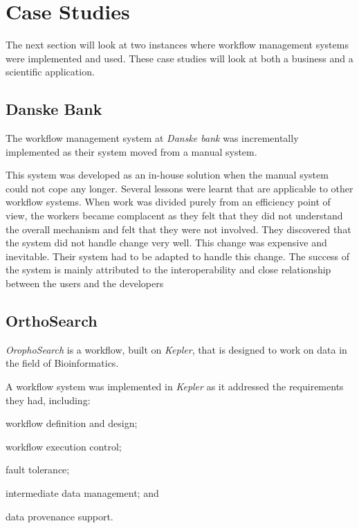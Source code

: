 \section{Case Studies}
The next section will look at two instances where workflow management systems
were implemented and used.  These case studies will look at both a business and
a scientific application.
    \subsection*{Danske Bank}
      The workflow management system at \emph{Danske bank} was incrementally
      implemented as their system moved from a manual
      system\cite{Brahe:2007:SWW:1316624.1316661}.

      This system was developed as an in-house solution when the manual system
      could not cope any longer.  Several lessons were learnt that are applicable
      to other workflow systems. When work was divided purely from an
      efficiency point of view, the workers became complacent as they felt that
      they did not understand the overall mechanism and felt that they were not
      involved. They discovered that the system did not handle change very
      well. This change was expensive and inevitable. Their system had to be
      adapted to handle this change. The success of the system is mainly
      attributed to the interoperability and close relationship between the
      users and the developers

    \subsection*{OrthoSearch}
      \emph{OrophoSearch} is a workflow, built on \emph{Kepler}, that is
      designed to work on data in the field of Bioinformatics.
      \cite{daCruz:2008:OSW:1363686.1363983}

      A workflow system was implemented in \emph{Kepler} as it addressed the
      requirements they had, including: \begin{inparaenum}[(i)] \item workflow
      definition and design; \item workflow execution control; \item fault
      tolerance; \item intermediate data management; and \item data provenance
      support.  \end{inparaenum}


